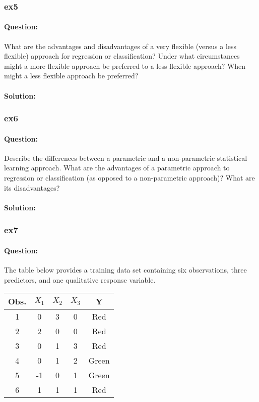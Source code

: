 \documentclass[a4paper,12pt,titlepage]{article} %
\begin{document}
\subsubsection{ex5}
\paragraph{Question:} What are the advantages and disadvantages of a very flexible (versus a less flexible) approach for regression or classification? Under what circumstances might a more flexible approach be preferred to a less flexible approach? When might a less flexible approach be preferred?

\paragraph{Solution:}

\subsubsection{ex6}
\paragraph{Question:} Describe the differences between a parametric and a non-parametric statistical learning approach. What are the advantages of a parametric approach to regression or classification (as opposed to a non-parametric approach)? What are its disadvantages?

\paragraph{Solution:}

\subsubsection{ex7}
\paragraph{Question:} The table below provides a training data set containing six observations, three predictors, and one qualitative response variable.

\begin{center}
	\begin{tabular}{c|cccc}
		\hline
		Obs.& $X_{1}$ & $X_{2}$ & $X_{3}$ & Y \\
		\hline
		1 & 0 & 3 & 0 & Red \\
		2 & 2 & 0 & 0 & Red \\
		3 & 0 & 1 & 3 & Red \\
		4 & 0 & 1 & 2 & Green \\
		5 & -1 & 0 & 1 & Green \\
		6 & 1 & 1 & 1 & Red \\
		\hline
	\end{tabular}
\end{center}
\end{document}
